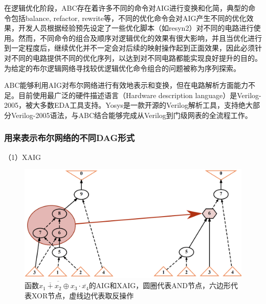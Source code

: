 


在逻辑优化阶段，ABC存在着许多不同的命令对AIG进行变换和化简，典型的命令包括balance, refactor, rewrite等，不同的优化命令会对AIG产生不同的优化效果，开发人员根据经验预先设定了一些优化脚本（如resyn2）对不同的电路进行使用。然而，不同命令的组合及顺序对逻辑优化的效果有很大影响，并且当优化进行到一定程度后，继续优化并不一定会对后续的映射操作起到正面效果\cite{LS:PIMap}，因此必须针对不同的电路提供不同的优化序列，以达到对不同电路都能实现良好提升的目的。为给定的布尔逻辑网络寻找较优逻辑优化命令组合的问题被称为序列探索。

ABC能够利用AIG对布尔网络进行有效地表示和变换，但在电路解析方面能力不足。目前使用最广泛的硬件描述语言（Hardware description language）是Verilog-2005，被大多数EDA工具支持。Yosys\cite{LS:yosys}是一款开源的Verilog解析工具，支持绝大部分Verilog-2005语法，与ABC结合能够完成从Verilog到门级网表的全流程工作。

\subsubsection{用来表示布尔网络的不同DAG形式}

（1）XAIG

\begin{figure}[!htbp]
    \centering
    \includegraphics[width=0.75\linewidth]{./figs/LS-XAIG.png}
    \caption{函数$ \overline{ \overline{x_1 + x_2} \oplus x_3} \cdot \overline{x_4} $的AIG和XAIG，圆圈代表AND节点，六边形代表XOR节点，虚线边代表取反操作}
    \label{LS:XAIG}
\end{figure}

